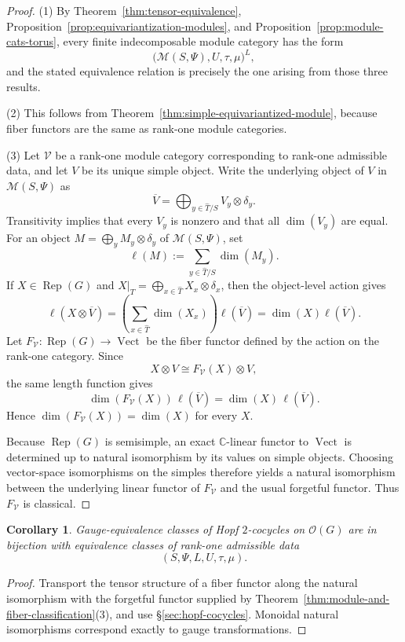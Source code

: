 \documentclass{amsart}
\newtheorem{corollary}[theorem]{Corollary}
\theoremstyle{definition}
\newcommand{\Rep}{\operatorname{Rep}}
\newcommand{\Vect}{\operatorname{Vect}}
\newcommand{\M}{\mathscr{M}}
\newcommand{\V}{\mathscr{V}}
\numberwithin{equation}{section}
\begin{document}
\begin{proof}
(1) By Theorem~\ref{thm:tensor-equivalence}, Proposition~\ref{prop:equivariantization-modules}, and Proposition~\ref{prop:module-cats-torus}, every finite indecomposable module category has the
form
\[
 \bigl(\M(S,\Psi),U,\tau,\mu\bigr)^L,
\]
and the stated equivalence relation is precisely the one arising from those three
results.  

(2) This follows from Theorem~\ref{thm:simple-equivariantized-module}, because fiber functors are the same as
rank-one module categories.

(3) Let $\V$ be a rank-one module category corresponding to
rank-one admissible data, and let $V$ be its unique simple object.  Write the
underlying object of $V$ in $\M(S,\Psi)$ as
\[
 \overline V=\bigoplus_{y\in \widehat{T}/S}V_y\otimes\delta_y.
\]
Transitivity implies that every $V_y$ is nonzero and that all $\dim (V_y)$ are equal.
For an object $M=\bigoplus_yM_y\otimes\delta_y$ of $\M(S,\Psi)$, set
\[
 \ell(M):=\sum_{y\in \widehat{T}/S}\dim (M_y).
\]
If $X\in\Rep(G)$ and
$X|_T=\bigoplus_{x\in \widehat{T}}X_x\otimes\delta_x$, then the object-level action gives
\[
 \ell(X\otimes\overline V)
 =\left(\sum_{x\in \widehat{T}}\dim (X_x)\right)\ell(\overline V)
 =\dim(X)\ell(\overline V).
\]
Let $F_{\V}:\Rep(G)\to\Vect$ be the fiber functor defined by the action on the
rank-one category.  Since
\[
 X\otimes V\cong F_{\V}(X)\otimes V,
\]
the same length function gives
\[
 \dim (F_{\V}(X))\,\ell(\overline V)
 =\dim(X)\,\ell(\overline V).
\]
Hence $\dim (F_{\V}(X))=\dim (X)$ for every $X$.

Because $\Rep(G)$ is semisimple, an exact $\mathbb C$-linear functor to $\Vect$ is
determined up to natural isomorphism by its values on simple objects.  Choosing
vector-space isomorphisms on the simples therefore yields a natural isomorphism
between the underlying linear functor of $F_{\V}$ and the usual forgetful functor.
Thus $F_{\V}$ is classical.
\end{proof}

\begin{corollary}\label{cor:hopf-cocycle-classification}
Gauge-equivalence classes of Hopf $2$-cocycles on $\mathscr{O}(G)$ are in bijection
with equivalence classes of rank-one admissible data
\[
 (S,\Psi,L,U,\tau,\mu).
\]
\end{corollary}

\begin{proof}
Transport the tensor structure of a fiber functor along the natural isomorphism
with the forgetful functor supplied by Theorem~\ref{thm:module-and-fiber-classification}(3), and use
\S\ref{sec:hopf-cocycles}.  Monoidal natural isomorphisms correspond exactly to
gauge transformations.
\end{proof}
\end{document}
